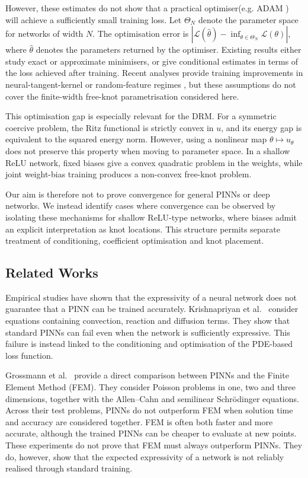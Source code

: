 \documentclass[11pt, onecolumn]{report}
\begin{document}
However, these estimates do not show that a practical optimiser(e.g. ADAM \cite{KingmaBa_Adam}) will achieve a sufficiently small training loss. Let $\Theta_N$ denote the parameter space for networks of width $N$. The optimisation error is $|\mathcal{L}(\widehat{\theta})-\inf_{\theta\in\Theta_N}\mathcal{L}(\theta)|$, where $\widehat{\theta}$ denotes the parameters returned by the optimiser. Existing results either study exact or approximate minimisers, or give conditional estimates in terms of the loss achieved after training. Recent analyses provide training improvements in neural-tangent-kernel or random-feature regimes \cite{ZhaoLuo_TrainingConvergence}, but these assumptions do not cover the finite-width free-knot parametrisation considered here.

This optimisation gap is especially relevant for the DRM. For a symmetric coercive problem, the Ritz functional is strictly convex in $u$, and its energy gap is equivalent to the squared energy norm. However, using a nonlinear map $\theta\mapsto u_\theta$ does not preserve this property when moving to parameter space. In a shallow ReLU network, fixed biases give a convex quadratic problem in the weights, while joint weight-bias training produces a non-convex free-knot problem.

Our aim is therefore not to prove convergence for general PINNs or deep networks. We instead identify cases where convergence can be observed by isolating these mechanisms for shallow ReLU-type networks, where biases admit an explicit interpretation as knot locations. This structure permits separate treatment of conditioning, coefficient optimisation and knot placement.

\subsection{Related Works}
\label{sec:RelatedWorks}

Empirical studies have shown that the expressivity of a neural network does not guarantee that a PINN can be trained accurately. Krishnapriyan et al.\ \cite{Krishnapriyan_PINNFailure} consider equations containing convection, reaction and diffusion terms. They show that standard PINNs can fail even when the network is sufficiently expressive. This failure is instead linked to the conditioning and optimisation of the PDE-based loss function.

Grossmann et al.\ \cite{Grossmann_PINNFEM} provide a direct comparison between PINNs and the Finite Element Method (FEM). They consider Poisson problems in one, two and three dimensions, together with the Allen--Cahn and semilinear Schr\"odinger equations. Across their test problems, PINNs do not outperform FEM when solution time and accuracy are considered together. FEM is often both faster and more accurate, although the trained PINNs can be cheaper to evaluate at new points. These experiments do not prove that FEM must always outperform PINNs. They do, however, show that the expected expressivity of a network is not reliably realised through standard training.
\end{document}
